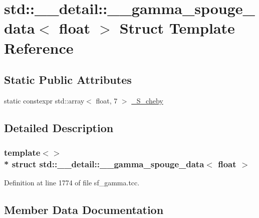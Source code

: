\hypertarget{structstd_1_1____detail_1_1____gamma__spouge__data_3_01float_01_4}{}\section{std\+:\+:\+\_\+\+\_\+detail\+:\+:\+\_\+\+\_\+gamma\+\_\+spouge\+\_\+data$<$ float $>$ Struct Template Reference}
\label{structstd_1_1____detail_1_1____gamma__spouge__data_3_01float_01_4}
\subsection*{Static Public Attributes}
\begin{DoxyCompactItemize}
\item 
static constexpr std\+::array$<$ float, 7 $>$ \hyperlink{structstd_1_1____detail_1_1____gamma__spouge__data_3_01float_01_4_a7ea259a3aade6eb09d994482b687c515}{\+\_\+\+S\+\_\+cheby}
\end{DoxyCompactItemize}


\subsection{Detailed Description}
\subsubsection*{template$<$$>$\\*
struct std\+::\+\_\+\+\_\+detail\+::\+\_\+\+\_\+gamma\+\_\+spouge\+\_\+data$<$ float $>$}



Definition at line 1774 of file sf\+\_\+gamma.\+tcc.



\subsection{Member Data Documentation}
